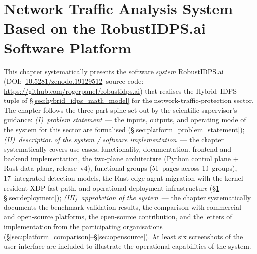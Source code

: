 
\chapter{Network Traffic Analysis System Based on the RobustIDPS.ai Software Platform}
\label{ch:platform}

This chapter systematically presents the software \emph{system}
\textsf{RobustIDPS.ai}~\cite{Anaedevha2026robustidps}
(DOI:~\url{10.5281/zenodo.19129512}; source code:
\url{https://github.com/rogerpanel/robustidps.ai}) that realises
the Hybrid~IDPS tuple of \S\ref{sec:hybrid_idps_math_model} for the
network-traffic-protection sector. The chapter follows the
three-part spine set out by the scientific supervisor's guidance:
\emph{(I)~problem statement}~--- the inputs, outputs, and operating
mode of the system for this sector are formalised
(\S\ref{sec:platform_problem_statement});
\emph{(II)~description of the system / software implementation}~---
the chapter systematically covers use cases, functionality,
documentation, frontend and backend implementation, the two-plane
architecture (Python control plane + Rust data plane, release~v4),
functional groups (51~pages across 10~groups), 17~integrated
detection models, the Rust edge-agent migration with the kernel-
resident XDP fast path, and operational deployment infrastructure
(\S\ref{ch:platform}--\S\ref{sec:deployment});
\emph{(III)~approbation of the system}~--- the chapter
systematically documents the benchmark validation results, the
comparison with commercial and open-source platforms, the
open-source contribution, and the letters of implementation from
the participating organisations
(\S\ref{sec:platform_comparison}--\S\ref{sec:opensource}).
At least six screenshots of the user interface are included to
illustrate the operational capabilities of the system.

